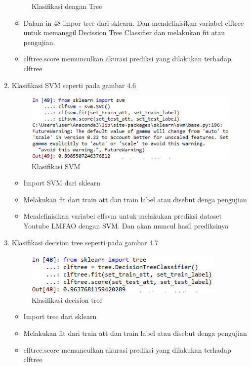 \begin{enumerate}
\begin{figure}[ht]
\caption{Klasifikasi dengan Tree}
\end{figure}
\begin{itemize}
\item Dalam in 48 impor tree dari sklearn. Dan mendefinisikan variabel clftree untuk memanggil Decission Tree Classifier dan melakukan fit atau pengujian.
\item clftree.score memunculkan akurasi prediksi yang dilakukan terhadap clftree
\end{itemize}
\item Klasifikasi SVM seperti pada gambar 4.6
\begin{figure}[ht]
\centering
\includegraphics[scale=0.9]{figures/pandas/4_8.png}
\caption{Klasifikasi SVM}
\end{figure}
\begin{itemize}
\item Import SVM dari  sklearn
\item Melakukan fit dari train att dan train label atau disebut denga pengujian
\item Mendefinisikan variabel clfsvm untuk melakukan prediksi dataset Youtube LMFAO dengan SVM. Dan akan muncul hasil prediksinya 
\end{itemize}
\item Klasifikasi decision tree seperti pada gambar 4.7
\begin{figure}[ht]
\centering
\includegraphics[scale=0.9]{figures/pandas/4_7.png}
\caption{Klasifikasi decision tree}
\end{figure}
\begin{itemize}
\item Import tree dari  sklearn
\item Melakukan fit dari train att dan train label atau disebut denga pengujian
\item  clftree.score memunculkan akurasi prediksi yang dilakukan terhadap clftree 

\end{itemize}
\end{enumerate}
